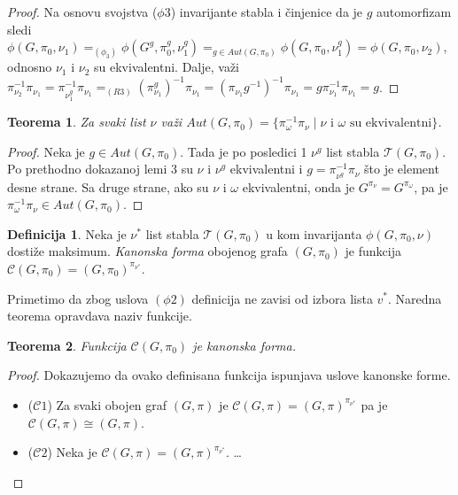 \documentclass[12pt,oneside]{memoir}
\newtheorem{theorem}{Teorema}
\theoremstyle{definition}
\newtheorem*{definition}{Definicija}
\begin{document}
  \begin{proof}
	  Na osnovu svojstva ($\phi3$) invarijante stabla i činjenice da je $g$
	  automorfizam sledi $\phi(G, \pi_0, \nu_1) =_{(\phi_3)} \phi(G^g, \pi_0^g,
	  \nu_1^g) =_{g \in Aut(G, \pi_0)} \phi(G, \pi_0, \nu_1^g) = \phi(G, \pi_0,
	  \nu_2)$, odnosno $\nu_1$ i $\nu_2$ su ekvivalentni. Dalje, važi
	  $\pi_{\nu_2}^{-1}\pi_{\nu_1} = \pi_{\nu_1^g}^{-1}\pi_{\nu_1} =_{(R3)}
	  (\pi_{\nu_1}^g)^{-1}\pi_{\nu_1} = (\pi_{\nu_1} g^{-1})^{-1} \pi_{\nu_1} = g
	  \pi_{\nu_1}^{-1} \pi_{\nu_1} = g$.
  \end{proof}

  \begin{theorem}
	  Za svaki list $\nu$ važi $Aut(G, \pi_0) = \{\pi_{\omega}^{-1}\pi_{\nu}
	  \mid \text{$\nu$ i $\omega$ su ekvivalentni} \}$.
  \end{theorem}
  
  \begin{proof}
	  Neka je $g \in Aut(G, \pi_0)$. Tada je po posledici 1 $\nu^g$ list stabla
	  $\mathcal{T}(G, \pi_0)$. Po prethodno dokazanoj lemi 3 su $\nu$ i $\nu^g$
	  ekvivalentni i $g = \pi_{\nu^g}^{-1}\pi_\nu$ što je element desne strane.
	  Sa druge strane, ako su $\nu$ i $\omega$ ekvivalentni, onda je
	  $G^{\pi_\nu} = G^{\pi_\omega}$, pa je $\pi_\omega^{-1}\pi_\nu \in Aut(G,
	  \pi_0)$.
  \end{proof}

  \begin{definition}
	  Neka je $\nu^*$ list stabla $\mathcal{T}(G, \pi_0)$ u kom invarijanta
	  $\phi(G, \pi_0, \nu)$ dostiže maksimum. \emph{Kanonska forma} obojenog
	  grafa $(G, \pi_0)$ je funkcija $\mathcal{C}(G, \pi_0) = (G,
	  \pi_0)^{\pi_{\nu^*}}$.
  \end{definition}

  Primetimo da zbog uslova $(\phi2)$ definicija ne zavisi od izbora lista
  $v^*$. Naredna teorema opravdava naziv funkcije.

  \begin{theorem}
	  Funkcija $\mathcal{C}(G, \pi_0)$ je kanonska forma.
  \end{theorem}

  \begin{proof}
	  Dokazujemo da ovako definisana funkcija ispunjava uslove kanonske forme.
	  \begin{itemize}
		  \item [] ($\mathcal{C}1$) Za svaki obojen graf $(G, \pi)$ je
			  $\mathcal{C}(G, \pi) = (G, \pi)^{\pi_{\nu^*}}$ pa je
			  $\mathcal{C}(G, \pi) \cong (G, \pi)$.
		  \item [] ($\mathcal{C}2$) Neka je $\mathcal{C}(G, \pi) = (G, \pi)^{\pi_{\nu^*}}$. \dots
	  \end{itemize}
  \end{proof}
\end{document}
